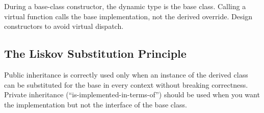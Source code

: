 During a base-class constructor, the dynamic type is the base class. Calling a virtual function calls the base implementation, not the derived override. Design constructors to avoid virtual dispatch.

\subsection{The Liskov Substitution Principle}

Public inheritance is correctly used only when an instance of the derived class can be substituted for the base in every context without breaking correctness. Private inheritance (``is-implemented-in-terms-of'') should be used when you want the implementation but not the interface of the base class.
